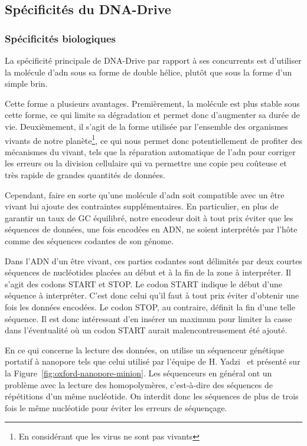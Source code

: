 \documentclass[a4paper]{report}
\begin{document}
\subsection{Spécificités du DNA-Drive}

\subsubsection{Spécificités biologiques}

La spécificité principale de DNA-Drive par rapport à ses concurrents est d'utiliser la molécule d'\ac{adn} sous sa forme de double hélice, plutôt que sous la forme d'un simple brin.

Cette forme a plusieurs avantages.
Premièrement, la molécule est plus stable sous cette forme, ce qui limite sa dégradation et permet donc d'augmenter sa durée de vie.
Deuxièmement, il s'agit de la forme utilisée par l'ensemble des organismes vivants de notre planète\footnote{En considérant que les virus ne sont pas vivants},
ce qui nous permet donc potentiellement de profiter des mécanismes du vivant,
tels que la réparation automatique de l’\ac{adn} pour corriger les erreurs
ou la division cellulaire qui va permettre une copie peu coûteuse et très rapide de grandes quantités de données.

Cependant, faire en sorte qu'une molécule d'\ac{adn} soit compatible avec un être vivant lui ajoute des contraintes supplémentaires.
En particulier, en plus de garantir un taux de GC équilibré,
notre encodeur doit à tout prix éviter que les séquences de données, une fois encodées en ADN,
ne soient interprétés par l'hôte comme des séquences codantes de son génome.

Dans l'ADN d'un être vivant, ces parties codantes sont délimités par deux courtes séquences de nucléotides placées au début et à la fin de la zone à interpréter.
Il s'agit des codons START et STOP.
Le codon START indique le début d'une séquence à interpréter.
C'est donc celui qu'il faut à tout prix éviter d'obtenir une fois les données encodées.
Le codon STOP, au contraire, définit la fin d'une telle séquence.
Il est donc intéressant d'en insérer un maximum pour limiter la casse dans l'éventualité où un codon START aurait malencontreusement été ajouté.

En ce qui concerne la lecture des données, on utilise un séquenceur génétique portatif à
nanopore tels que celui utilisé par l’équipe de H. Yadzi~\cite{yazdi2017portable} et présenté sur la Figure~\ref{fig:oxford-nanopore-minion}.
Les séquenceurs en général ont un problème avec la lecture des homopolymères, c’est-à-dire des
séquences de répétitions d’un même nucléotide. On interdit donc les séquences de plus de trois fois
le même nucléotide pour éviter les erreurs de séquençage.
\end{document}
